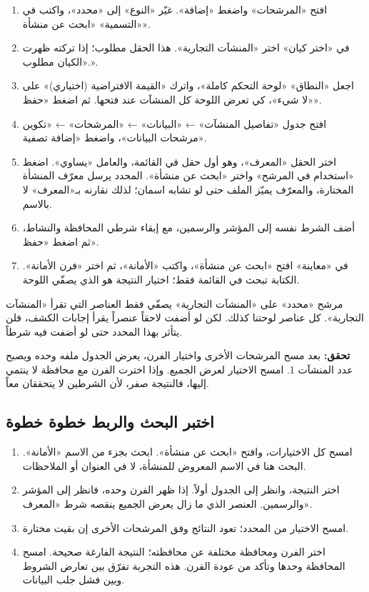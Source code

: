 \begin{enumerate}
\item افتح «المرشحات» واضغط «إضافة». غيّر «النوع» إلى «محدد»، واكتب في «التسمية» «ابحث عن منشأة».
\item في «اختر كيان» اختر «المنشآت التجارية». هذا الحقل مطلوب؛ إذا تركته ظهرت «الكيان مطلوب.».
\item اجعل «النطاق» «لوحة التحكم كاملة»، واترك «القيمة الافتراضية (اختياري)» على «لا شيء»، كي تعرض اللوحة كل المنشآت عند فتحها. ثم اضغط «حفظ».
\item افتح جدول «تفاصيل المنشآت» ← «البيانات» ← «المرشحات» ← «تكوين مرشحات البيانات»، واضغط «إضافة تصفية».
\item اختر الحقل «المعرف»، وهو أول حقل في القائمة، والعامل «يساوي». اضغط «استخدام في المرشح» واختر «ابحث عن منشأة». المحدد يرسل معرّف المنشأة المختارة، والمعرّف يميّز الملف حتى لو تشابه اسمان؛ لذلك نقارنه بـ«المعرف» لا بالاسم.
\item أضف الشرط نفسه إلى المؤشر والرسمين، مع إبقاء شرطي المحافظة والنشاط، ثم اضغط «حفظ».
\item في «معاينة» افتح «ابحث عن منشأة»، واكتب «الأمانة»، ثم اختر «فرن الأمانة». الكتابة تبحث في القائمة فقط؛ اختيار النتيجة هو الذي يصفّي اللوحة.
\end{enumerate}

\begin{rcwarn}
مرشح «محدد» على «المنشآت التجارية» يصفّي فقط العناصر التي تقرأ «المنشآت التجارية». كل عناصر لوحتنا كذلك. لكن لو أضفت لاحقاً عنصراً يقرأ إجابات الكشف، فلن يتأثر بهذا المحدد حتى لو أضفت فيه شرطاً.
\end{rcwarn}

\textbf{تحقق:} بعد مسح المرشحات الأخرى واختيار الفرن، يعرض الجدول ملفه وحده ويصبح عدد المنشآت 1. امسح الاختيار لعرض الجميع. وإذا اخترت الفرن مع محافظة لا ينتمي إليها، فالنتيجة صفر، لأن الشرطين لا يتحققان معاً.

\subsection{اختبر البحث والربط خطوة خطوة}

\begin{enumerate}
\item امسح كل الاختيارات، وافتح «ابحث عن منشأة». ابحث بجزء من الاسم «الأمانة». البحث هنا في الاسم المعروض للمنشأة، لا في العنوان أو الملاحظات.
\item اختر النتيجة، وانظر إلى الجدول أولاً. إذا ظهر الفرن وحده، فانظر إلى المؤشر والرسمين. العنصر الذي ما زال يعرض الجميع ينقصه شرط «المعرف».
\item امسح الاختيار من المحدد؛ تعود النتائج وفق المرشحات الأخرى إن بقيت مختارة.
\item اختر الفرن ومحافظة مختلفة عن محافظته؛ النتيجة الفارغة صحيحة. امسح المحافظة وحدها وتأكد من عودة الفرن. هذه التجربة تفرّق بين تعارض الشروط وبين فشل جلب البيانات.
\end{enumerate}

